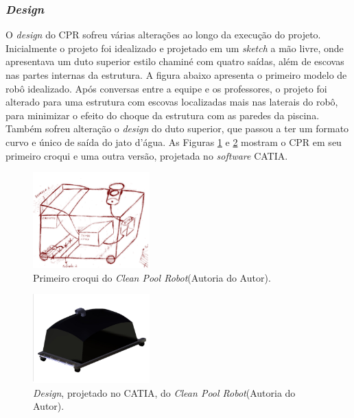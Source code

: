 \subsubsection{\textit{Design}}
O \textit{design} do CPR sofreu várias alterações ao longo da execução do
projeto. Inicialmente o projeto foi idealizado e projetado em um \textit{sketch}
a mão livre, onde apresentava um duto superior estilo chaminé com quatro saídas,
além de escovas nas partes internas da estrutura. A figura abaixo apresenta o
primeiro modelo de robô idealizado. Após conversas entre a equipe e os professores,
o projeto foi alterado para uma estrutura com escovas localizadas mais nas
laterais do robô, para minimizar o efeito do choque da estrutura com as paredes
da piscina. Também sofreu alteração o \textit{design} do duto superior, que
passou a ter um formato curvo e único de saída do jato d’água. As Figuras
\ref{fig:croqui-v1} e \ref{fig:croqui-v2} mostram o CPR em seu primeiro
croqui e uma outra versão, projetada no \textit{software} \textsf{CATIA}.
\begin{figure}[h]
  \centering
  \includegraphics[width=0.4\textwidth]{figuras/croqui-v1.png}
  \caption{Primeiro croqui do \textit{Clean Pool Robot}(\textsf{Autoria do Autor}).}
  \label{fig:croqui-v1}
\end{figure}
\FloatBarrier

\begin{figure}[h]
  \centering
  \includegraphics[width=0.4\textwidth]{figuras/croqui-v2.png}
  \caption{\textit{Design}, projetado no \textsf{CATIA}, do \textit{Clean Pool Robot}(\textsf{Autoria do Autor}).}
  \label{fig:croqui-v2}
\end{figure}
\FloatBarrier

